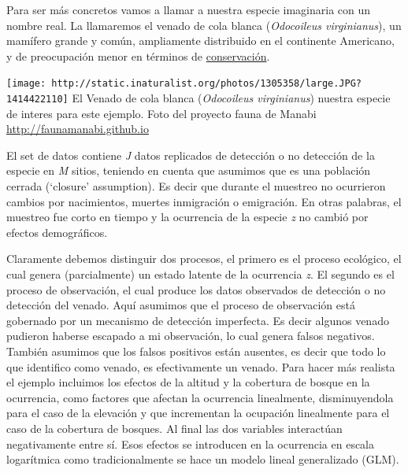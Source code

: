 \documentclass[]{book}
\begin{document}
Para ser más concretos vamos a llamar a nuestra especie imaginaria con
un nombre real. La llamaremos el venado de cola blanca (\emph{Odocoileus
virginianus}), un mamífero grande y común, ampliamente distribuido en el
continente Americano, y de preocupación menor en términos de
\href{http://www.iucnredlist.org/details/42394}{conservación}.

\texttt{[image: http://static.inaturalist.org/photos/1305358/large.JPG?1414422110]}
El Venado de cola blanca (\emph{Odocoileus virginianus}) nuestra especie
de interes para este ejemplo. Foto del proyecto fauna de Manabi
\url{http://faunamanabi.github.io}

El set de datos contiene \emph{J} datos replicados de detección o no
detección de la especie en \emph{M} sitios, teniendo en cuenta que
asumimos que es una población cerrada (`closure' assumption). Es decir
que durante el muestreo no ocurrieron cambios por nacimientos, muertes
inmigración o emigración. En otras palabras, el muestreo fue corto en
tiempo y la ocurrencia de la especie \emph{z} no cambió por efectos
demográficos.

Claramente debemos distinguir dos procesos, el primero es el proceso
ecológico, el cual genera (parcialmente) un estado latente de la
ocurrencia \emph{z}. El segundo es el proceso de observación, el cual
produce los datos observados de detección o no detección del venado.
Aquí asumimos que el proceso de observación está gobernado por un
mecanismo de detección imperfecta. Es decir algunos venado pudieron
haberse escapado a mi observación, lo cual genera falsos negativos.
También asumimos que los falsos positivos están ausentes, es decir que
todo lo que identifico como venado, es efectivamente un venado. Para
hacer más realista el ejemplo incluimos los efectos de la altitud y la
cobertura de bosque en la ocurrencia, como factores que afectan la
ocurrencia linealmente, disminuyendola para el caso de la elevación y
que incrementan la ocupación linealmente para el caso de la cobertura de
bosques. Al final las dos variables interactúan negativamente entre sí.
Esos efectos se introducen en la ocurrencia en escala logarítmica como
tradicionalmente se hace un modelo lineal generalizado (GLM).
\end{document}
